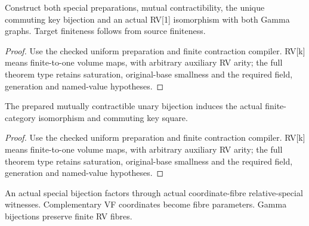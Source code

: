 \begin{lemma}

\label{s5-2}


\leanok

Construct both special preparations, mutual contractibility, the unique commuting key bijection and an actual RV[1] isomorphism with both Gamma graphs. Target finiteness follows from source finiteness.

\end{lemma}

\begin{proof}


\leanok

Use the checked uniform preparation and finite contraction compiler. RV[k] means finite-to-one volume maps, with arbitrary auxiliary RV arity; the full theorem type retains saturation, original-base smallness and the required field, generation and named-value hypotheses.

\end{proof}

\begin{lemma}

\label{s5-3}


\leanok

The prepared mutually contractible unary bijection induces the actual finite-category isomorphism and commuting key square.

\end{lemma}

\begin{proof}


\leanok

Use the checked uniform preparation and finite contraction compiler. RV[k] means finite-to-one volume maps, with arbitrary auxiliary RV arity; the full theorem type retains saturation, original-base smallness and the required field, generation and named-value hypotheses.

\end{proof}

\begin{lemma}

\label{s5-4}


\leanok

An actual special bijection factors through actual coordinate-fibre relative-special witnesses. Complementary VF coordinates become fibre parameters. Gamma bijections preserve finite RV fibres.

\end{lemma}

